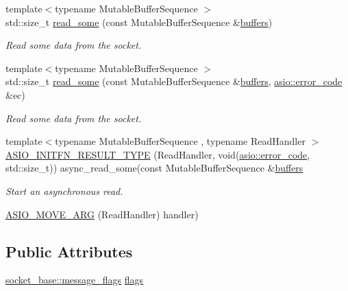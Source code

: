 \begin{DoxyCompactItemize}
\item 
{\footnotesize template$<$typename Mutable\+Buffer\+Sequence $>$ }\\std\+::size\+\_\+t \hyperlink{classasio_1_1basic__stream__socket_ae8a201d4567b3e588b439a0352271cf1}{read\+\_\+some} (const Mutable\+Buffer\+Sequence \&\hyperlink{group__async__read_ga54dede45c3175148a77fe6635222c47d}{buffers})
\begin{DoxyCompactList}\small\item\em Read some data from the socket. \end{DoxyCompactList}\item 
{\footnotesize template$<$typename Mutable\+Buffer\+Sequence $>$ }\\std\+::size\+\_\+t \hyperlink{classasio_1_1basic__stream__socket_a0c5b977fdc7a55f36566ffa6000ca016}{read\+\_\+some} (const Mutable\+Buffer\+Sequence \&\hyperlink{group__async__read_ga54dede45c3175148a77fe6635222c47d}{buffers}, \hyperlink{classasio_1_1error__code}{asio\+::error\+\_\+code} \&ec)
\begin{DoxyCompactList}\small\item\em Read some data from the socket. \end{DoxyCompactList}\item 
{\footnotesize template$<$typename Mutable\+Buffer\+Sequence , typename Read\+Handler $>$ }\\\hyperlink{classasio_1_1basic__stream__socket_a344952f6d1aa44da849ce0b274a27950}{A\+S\+I\+O\+\_\+\+I\+N\+I\+T\+F\+N\+\_\+\+R\+E\+S\+U\+L\+T\+\_\+\+T\+Y\+P\+E} (Read\+Handler, void(\hyperlink{classasio_1_1error__code}{asio\+::error\+\_\+code}, std\+::size\+\_\+t)) async\+\_\+read\+\_\+some(const Mutable\+Buffer\+Sequence \&\hyperlink{group__async__read_ga54dede45c3175148a77fe6635222c47d}{buffers}
\begin{DoxyCompactList}\small\item\em Start an asynchronous read. \end{DoxyCompactList}\item 
\hyperlink{classasio_1_1basic__stream__socket_ab4d3d3c54c32d560b4a3b7e8df39a1c3}{A\+S\+I\+O\+\_\+\+M\+O\+V\+E\+\_\+\+A\+R\+G} (Read\+Handler) handler)
\end{DoxyCompactItemize}
\subsection*{Public Attributes}
\begin{DoxyCompactItemize}
\item 
\hyperlink{classasio_1_1socket__base_ac3cf77465dfedfe1979b5415cf32cc94}{socket\+\_\+base\+::message\+\_\+flags} \hyperlink{classasio_1_1basic__stream__socket_a49da9b10ef73407f4991c633ced27111}{flags}
\end{DoxyCompactItemize}
